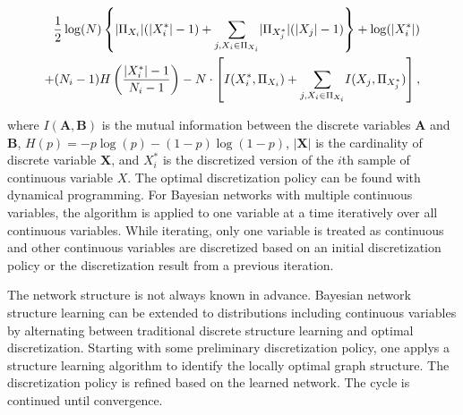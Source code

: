 \begin{equation}
\begin{aligned}
\frac{1}{2} \log(N) \left\lbrace  \lvert \Pi_{X_i} \rvert (\lvert X^*_i \rvert - 1) +
 {\sum_{j,X_i \in \Pi_{X_i}}} \lvert \Pi_{X^*_j} \rvert (\lvert X_j \rvert - 1) \right\rbrace + \log(\lvert {X^*_i} \rvert) \\
 + (N_i-1) H \left( {{|X^*_i| - 1}\over{N_i -1}}  \right) -N \cdot \left[ I(X^*_i,\Pi_{X_i}) + {\sum_{j,X_i \in \Pi_{X_i}}} I(X_j, \Pi_{X^*_j}) \right],
\end{aligned}
\end{equation}

\noindent
where $I(\boldsymbol{A},\boldsymbol{B})$ is the mutual information between the discrete variables $\boldsymbol{A}$ and $\boldsymbol{B}$, ${H(p) = -p \log(p) - (1-p) \log(1-p)}$, $|\boldsymbol{X}|$ is the cardinality of discrete variable $\boldsymbol{X}$, and $X^*_i$ is the discretized version of the $i$th sample of continuous variable $X$.
The optimal discretization policy can be found with dynamical programming.
For Bayesian networks with multiple continuous variables, the algorithm is applied to one variable at a time iteratively over all continuous variables.
While iterating, only one variable is treated as continuous and other continuous variables are discretized based on an initial discretization policy or the discretization result from a previous iteration.

The network structure is not always known in advance. Bayesian network structure learning can be extended to distributions including continuous variables by alternating between traditional discrete structure learning and optimal discretization. Starting with some preliminary discretization policy, one applys a structure learning algorithm to identify the locally optimal graph structure. The discretization policy is refined based on the learned network. The cycle is continued until convergence.


